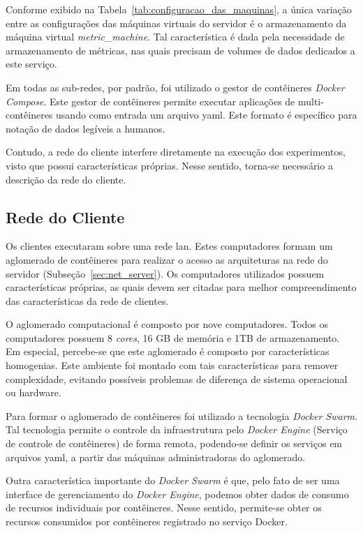 Conforme exibido na Tabela~\ref{tab:configuracao_das_maquinas}, a única variação entre as configurações das máquinas virtuais do servidor é o armazenamento da máquina virtual \textit{metric\_machine}.
%
Tal característica é dada pela necessidade de armazenamento de métricas, nas quais precisam de volumes de dados dedicados a este serviço.



Em todas as sub-redes, por padrão, foi utilizado o gestor de contêineres \textit{Docker Compose}.
%
Este gestor de contêineres permite executar aplicações de multi-contêineres usando como entrada um arquivo \ac{yaml}.
%
Este formato é específico para notação de dados legíveis a humanos.



Contudo, a rede do cliente interfere diretamente na execução dos experimentos, visto que possui características próprias.
%
Nesse sentido, torna-se necessário a descrição da rede do cliente.

\subsection{Rede do Cliente}
\label{sec:net_cliente}


Os clientes executaram sobre uma rede \ac{lan}.
%
Estes computadores formam um aglomerado de contêineres para realizar o acesso as arquiteturas na rede do servidor (Subseção~\ref{sec:net_server}).
%
Os computadores utilizados possuem características próprias, as quais devem ser citadas para melhor compreendimento das características da rede de clientes.

O aglomerado computacional é composto por nove computadores.
%
Todos os computadores possuem 8 \textit{cores}, 16 GB de memória e 1TB de armazenamento.
%
Em especial, percebe-se que este aglomerado é composto por características homogenias.
%
Este ambiente foi montado com tais características para remover complexidade, evitando possíveis problemas de diferença de sistema operacional ou hardware.

Para formar o aglomerado de contêineres foi utilizado a tecnologia \textit{Docker Swarm}.
%
Tal tecnologia permite o controle da infraestrutura pelo \textit{Docker Engine} (Serviço de controle de contêineres) de forma remota, podendo-se definir os serviços em arquivos \ac{yaml}, a partir das máquinas administradoras do aglomerado.

Outra característica importante do \textit{Docker Swarm} é que, pelo fato de ser uma interface de gerenciamento do \textit{Docker Engine}, podemos obter dados de consumo de recursos individuais por contêineres.
%
Nesse sentido, permite-se obter os recursos consumidos por contêineres registrado no serviço Docker.

